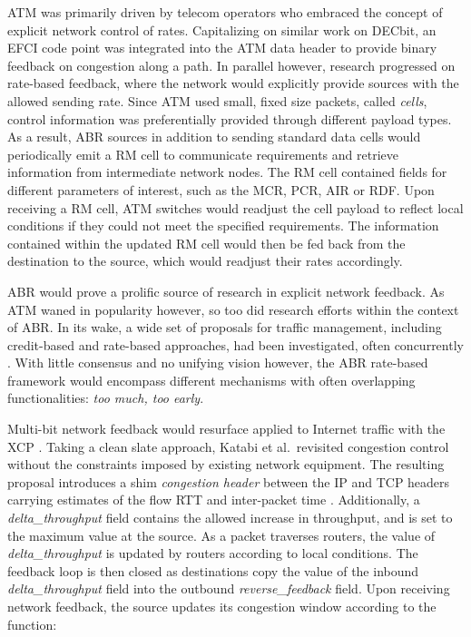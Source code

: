 ATM was primarily driven by telecom operators who embraced the concept of explicit network control of rates. 
Capitalizing on similar work on DECbit, an \ac{EFCI} code point was integrated into the ATM data header to provide binary feedback on congestion along a path.
In parallel however, research progressed on rate-based feedback, where the network would explicitly provide sources with the allowed sending rate.
Since \ac{ATM} used small, fixed size packets, called \emph{cells}, control information was preferentially provided through different payload types.
As a result, \ac{ABR} sources in addition to sending standard data cells would periodically emit a \ac{RM} cell to communicate requirements and retrieve information from intermediate network nodes.
The \ac{RM} cell contained fields for different parameters of interest, such as the \ac{MCR}, \ac{PCR}, \ac{AIR} or \ac{RDF}.
Upon receiving a \ac{RM} cell, \ac{ATM} switches would readjust the cell payload to reflect local conditions if they could not meet the specified requirements.
The information contained within the updated \ac{RM} cell would then be fed back from the destination to the source, which would readjust their rates accordingly.

\ac{ABR} would prove a prolific source of research in explicit network feedback.
As \ac{ATM} waned in popularity however, so too did research efforts within the context of \ac{ABR}.
In its wake, a wide set of proposals for traffic management, including credit-based and rate-based approaches, had been investigated, often concurrently \cite{Jain:1996p484}.
With little consensus and no unifying vision however, the \ac{ABR} rate-based framework would encompass different mechanisms with often overlapping functionalities: \emph{too much, too early}.

Multi-bit network feedback would resurface applied to Internet traffic with the \ac{XCP} \cite{Katabi:2002p256}.
Taking a clean slate approach, Katabi et al.\ revisited congestion control without the constraints imposed by existing network equipment.
The resulting proposal introduces a shim \emph{congestion header} between the \ac{IP} and \ac{TCP} headers carrying estimates of the flow \ac{RTT} and inter-packet time \cite{Katabi:2007p485}.
Additionally, a \emph{delta\_throughput} field contains the allowed increase in throughput, and is set to the maximum value at the source.
As a packet traverses routers, the value of \emph{delta\_throughput} is updated by routers according to local conditions.
The feedback loop is then closed as destinations copy the value of the inbound \emph{delta\_throughput} field into the outbound \emph{reverse\_feedback} field.
Upon receiving network feedback, the source updates its congestion window according to the function:

